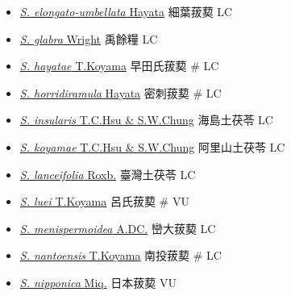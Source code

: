 \begin{itemize}
\begin{itemize}
        \item[] \href{http://www.theplantlist.org/tpl1.1/search?q=Smilax+elongato-umbellata}{\textit{S. elongato-umbellata} Hayata}   細葉菝葜   LC
        \item[] \href{http://www.theplantlist.org/tpl1.1/search?q=Smilax+glabra}{\textit{S. glabra} Wright}   禹餘糧   LC
        \item[] \href{http://www.theplantlist.org/tpl1.1/search?q=Smilax+hayatae}{\textit{S. hayatae} T.Koyama}   早田氏菝葜  \# LC
        \item[] \href{http://www.theplantlist.org/tpl1.1/search?q=Smilax+horridiramula}{\textit{S. horridiramula} Hayata}   密刺菝葜  \# LC
        \item[] \href{http://www.theplantlist.org/tpl1.1/search?q=Smilax+insularis}{\textit{S. insularis} T.C.Hsu \& S.W.Chung}   海島土茯苓   LC
        \item[] \href{http://www.theplantlist.org/tpl1.1/search?q=Smilax+koyamae}{\textit{S. koyamae} T.C.Hsu \& S.W.Chung}   阿里山土茯苓   LC
        \item[] \href{http://www.theplantlist.org/tpl1.1/search?q=Smilax+lanceifolia}{\textit{S. lanceifolia} Roxb.}   臺灣土茯苓   LC
        \item[] \href{http://www.theplantlist.org/tpl1.1/search?q=Smilax+luei}{\textit{S. luei} T.Koyama}   呂氏菝葜  \# VU
        \item[] \href{http://www.theplantlist.org/tpl1.1/search?q=Smilax+menispermoidea}{\textit{S. menispermoidea} A.DC.}   巒大菝葜   LC
        \item[] \href{http://www.theplantlist.org/tpl1.1/search?q=Smilax+nantoensis}{\textit{S. nantoensis} T.Koyama}   南投菝葜  \# LC
        \item[] \href{http://www.theplantlist.org/tpl1.1/search?q=Smilax+nipponica}{\textit{S. nipponica} Miq.}   日本菝葜   VU

\end{itemize}
\end{itemize}
